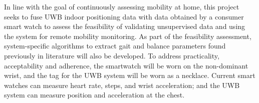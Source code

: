 In line with the goal of continuously assessing mobility at home, this project seeks to fuse 
UWB indoor positioning data with data obtained by a consumer smart watch to assess the 
feasibility of validating unsupervised data and using the system for remote mobility monitoring. 
As part of the feasibility assessment, system-specific algorithms to extract gait and balance 
parameters found previously in literature will also be developed. To address practicality, 
acceptability and adherence, the smartwatch will be worn on the non-dominant wrist, and the 
tag for the UWB system will be worn as a necklace. Current smart watches can measure heart rate, steps, 
and wrist acceleration; and the UWB system can measure position and acceleration at the chest.
